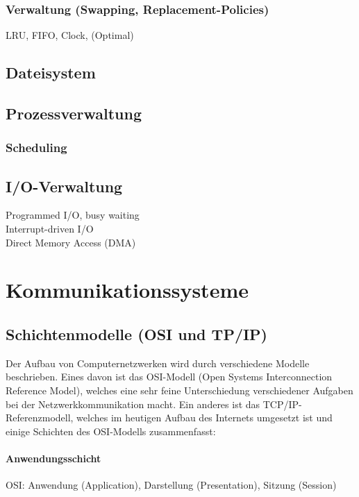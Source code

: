 \subsubsection{Verwaltung (Swapping, Replacement-Policies)}
LRU, FIFO, Clock, (Optimal)

\subsection{Dateisystem}

\subsection{Prozessverwaltung}

\subsubsection{Scheduling}

\subsection{I/O-Verwaltung}

Programmed I/O, busy waiting\\
Interrupt-driven I/O\\
Direct Memory Access (DMA)

%
%
%
\section{Kommunikationssysteme}

\subsection{Schichtenmodelle (OSI und TP/IP)}

Der Aufbau von Computernetzwerken wird durch verschiedene Modelle beschrieben.
Eines davon ist das OSI-Modell (Open Systems Interconnection Reference Model),
welches eine sehr feine Unterschiedung verschiedener Aufgaben bei der Netzwerkkommunikation macht.
Ein anderes ist das TCP/IP-Referenzmodell,
welches im heutigen Aufbau des Internets umgesetzt ist und einige Schichten des OSI-Modells zusammenfasst:

\paragraph{Anwendungsschicht}
OSI: Anwendung (Application), Darstellung (Presentation), Sitzung (Session)
